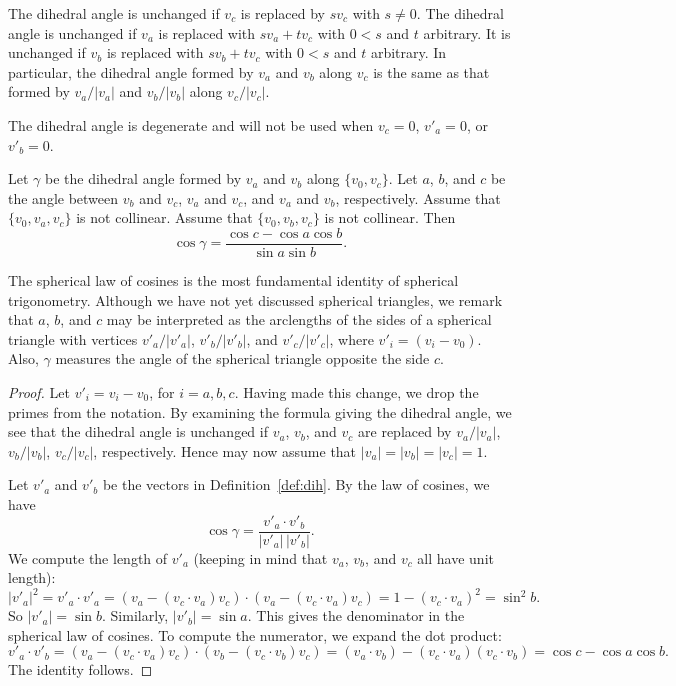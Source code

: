 The dihedral angle is unchanged if $v_c$ is replaced by $s v_c$ with
$s\ne0$. The dihedral angle is unchanged if $v_a$ is replaced with
$s v_a + t v_c$ with $0 < s$ and $t$ arbitrary.  It is unchanged if
$v_b$ is replaced with $s v_b + t v_c$ with $0 < s$ and $t$
arbitrary.  In particular, the dihedral angle formed by $v_a$ and
$v_b$ along $v_c$ is the same as that formed by $v_a/|v_a|$ and
$v_b/|v_b|$ along $v_c/|v_c|$.

The dihedral angle is degenerate and will not be used when $v_c =
0$, $v'_a = 0$, or $v'_b = 0$.




\begin{lemma}\label{lemma:sloc}
Let $\gamma$ be the dihedral angle formed by $v_a$ and $v_b$ along
$\{v_0,v_c\}$.  Let $a$, $b$, and $c$ be the
angle between $v_b$ and $v_c$, $v_a$ and $v_c$, and $v_a$ and
$v_b$, respectively. %
Assume that $\{v_0,v_a,v_c\}$ is not
collinear. Assume that $\{v_0,v_b,v_c\}$ is not collinear.
Then
    $$\cos\gamma = \frac{\cos c - \cos a \cos b}{\sin a\sin b}.$$
\end{lemma}

The spherical law of cosines is the most fundamental identity
of spherical trigonometry.
Although we have not yet discussed spherical
triangles, we remark that $a$, $b$, and $c$ may be interpreted as
the arclengths of the sides of a spherical triangle with
vertices $v'_a/|v'_a|$, $v'_b/|v'_b|$, and $v'_c/|v'_c|$,
where $v'_i = (v_i-v_0)$.  Also,
$\gamma$ measures the angle of the spherical triangle opposite the
side $c$.


\begin{proof}  Let $v'_i = v_i - v_0$, for $i=a,b,c$.  Having
made this change, we drop the primes from the notation.
By examining the formula giving the dihedral angle, we see that the
dihedral angle is unchanged if $v_a$, $v_b$, and $v_c$ are replaced
by $v_a/|v_a|$, $v_b/|v_b|$, $v_c/|v_c|$, respectively.  Hence
may now assume that $|v_a|=|v_b|=|v_c|=1$.

Let $v'_a$ and $v'_b$ be the vectors in Definition~\ref{def:dih}.
By the law of cosines, we have
        $$\cos\gamma = \frac{v'_a\cdot v'_b}{|v'_a|\,|v'_b|}.$$
We compute the length of $v'_a$ (keeping in mind that $v_a$, $v_b$,
and $v_c$ all have unit length):
        $$
        |v'_a|^2 = v'_a\cdot v'_a =
        (v_a - (v_c\cdot v_a)v_c)\cdot (v_a - (v_c\cdot v_a) v_c) =
        1 - (v_c\cdot v_a)^2 = \sin^2 b.
        $$
So $|v'_a| =\sin b$. Similarly, $|v'_b| = \sin a$.  This gives
the denominator in the spherical law of cosines. To compute the
numerator, we expand the dot product:
    $$
    v'_a\cdot v'_b = (v_a - (v_c\cdot v_a) v_c)\cdot (v_b - (v_c\cdot v_b) v_c)
    = (v_a\cdot v_b) - (v_c\cdot v_a) (v_c\cdot v_b) = \cos c - \cos
    a \cos b.
    $$
The identity follows.
\end{proof}

